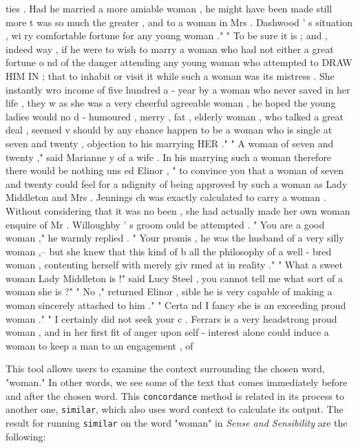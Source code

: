 \documentclass[11pt]{article}
\begin{document}
\begin{SOURCE}
ties . Had he married a more amiable woman , he might have been made still more
t was so much the greater , and to a woman in Mrs . Dashwood ' s situation , wi
ry comfortable fortune for any young woman ." " To be sure it is ; and , indeed
 way , if he were to wish to marry a woman who had not either a great fortune o
nd of the danger attending any young woman who attempted to DRAW HIM IN ; that 
 to inhabit or visit it while such a woman was its mistress . She instantly wro
income of five hundred a - year by a woman who never saved in her life , they w
as she was a very cheerful agreeable woman , he hoped the young ladies would no
d - humoured , merry , fat , elderly woman , who talked a great deal , seemed v
 should by any chance happen to be a woman who is single at seven and twenty , 
objection to his marrying HER ." " A woman of seven and twenty ," said Marianne
y of a wife . In his marrying such a woman therefore there would be nothing uns
ed Elinor , " to convince you that a woman of seven and twenty could feel for a
ndignity of being approved by such a woman as Lady Middleton and Mrs . Jennings
ch was exactly calculated to carry a woman . Without considering that it was no
been , she had actually made her own woman enquire of Mr . Willoughby ' s groom
ould be attempted . " You are a good woman ," he warmly replied . " Your promis
, he was the husband of a very silly woman ,-- but she knew that this kind of b
 all the philosophy of a well - bred woman , contenting herself with merely giv
rmed at in reality ." " What a sweet woman Lady Middleton is !" said Lucy Steel
 , you cannot tell me what sort of a woman she is ?" " No ," returned Elinor , 
sible he is very capable of making a woman sincerely attached to him ." " Certa
nd I fancy she is an exceeding proud woman ." " I certainly did not seek your c
. Ferrars is a very headstrong proud woman , and in her first fit of anger upon
self - interest alone could induce a woman to keep a man to an engagement , of 
\end{SOURCE}

This tool allows users to examine the context surrounding the chosen
word, "woman." In other words, we see some of the text that comes
immediately before and after the chosen word. This \texttt{concordance}
method is related in its process to another one, \texttt{similar}, which also
uses word context to calculate its output. The result for running
\texttt{similar} on the word "woman" in \emph{Sense and Sensibility} are the
following:
\end{document}
